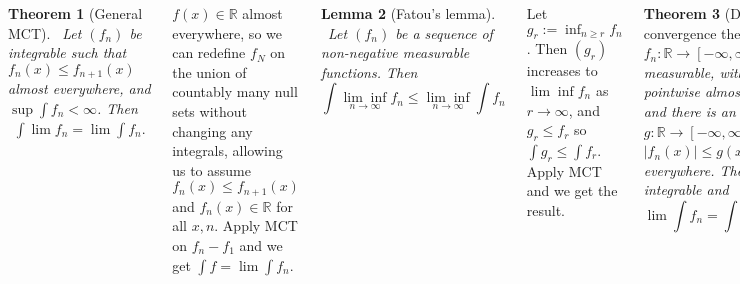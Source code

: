 \documentclass{tikzposter} %
\newtheorem{theorem}{Theorem}
\newtheorem{lemma}[theorem]{Lemma}
\begin{document}
\begin{columns}
{    \begin{theorem}[General MCT]
      \ Let $(f_{n})$ be integrable such that $f_{n}(x) \le f_{n+1}(x)$ almost everywhere, and $\sup \int f_{n} < \infty$. Then
      \begin{align*}
        \int \lim f_{n} = \lim \int f_{n}.
      \end{align*}
    \end{theorem}
    \hphantom{}

    $f(x) \in \mathbb{R}$ almost everywhere, so we can redefine $f_{N}$ on the union of countably many null sets without changing any integrals, allowing us to assume $f_{n}(x) \le f_{n+1}(x)$ and $f_{n}(x) \in \mathbb{R}$ for all $x, n$. Apply MCT on $f_{n} - f_{1}$ and we get $\int f = \lim \int f_{n}$. \\

    \begin{lemma}[Fatou's lemma]
      \ Let $(f_{n})$ be a sequence of non-negative measurable functions. Then
      \[
        \int \underset{n \to \infty}{\lim \inf} f_{n} \le \underset{n \to \infty}{\lim \inf} \int f_{n}
      \]
    \end{lemma}
    \hphantom{}

    Let $g_{r} := \inf_{n \ge r} f_{n}$. Then $(g_{r})$ increases to $\lim\inf f_{n}$ as $r \to \infty$, and $g_{r} \le f_{r}$ so $\int g_{r} \le \int f_{r}$. Apply MCT and we get the result. \\

    \begin{theorem}[Dominated convergence theorem]
      \ Let $f_{n} : \mathbb{R} \to [-\infty, \infty]$ be measurable, with $f_{n} \to f$ pointwise almost everywhere, and there is an integrable $g : \mathbb{R} \to [-\infty, \infty]$ such that $|f_{n}(x)| \le g(x)$ almost everywhere. Then $f$ is integrable and
      \[
        \lim \int f_{n} = \int f = \int \lim f_{n}
      \]
    \end{theorem}
    \hphantom{}

    Proof by applying Fatou's lemma to $g + f_{n}$ and $g - f_{n}$ to obtain $\int (g+f) \le \int g + \lim \inf \int f_{n}$ and $\int (g - f) \le \int g - \lim\sup \int f_{n}$. \\

    \begin{theorem}[Bounded convergence theorem]
      \ Let $I$ be a bounded interval, $(f_{n})$ a sequence of integrable functions on $I$ converging almost everywhere to $f$, and suppose that there is a constant $c$ such that for all $n$, $|f_{n}(x)| \le c$ almost everywhere. Then $f$ is integrable on $I$, and
      \begin{align*}
        \lim \int_{I} f_{n} = \int_{I} f = \int_{I} \lim f_{n}.
      \end{align*}
    \end{theorem}
    \hphantom{}

}
\end{columns}
\end{document}
